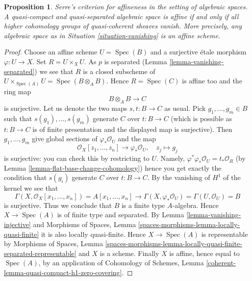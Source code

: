 \documentclass{stacks-project}
\newenvironment{slogan}{\comment}{\endcomment}
\theoremstyle{plain}
\newtheorem{proposition}[subsection]{Proposition}
\theoremstyle{definition}
\theoremstyle{remark}
\numberwithin{equation}{subsection}
\def\Spec{\mathop{\mathrm{Spec}}}
\begin{document}
\begin{proposition}
\label{proposition-vanishing-affine}
\begin{slogan}
Serre's criterion for affineness in the setting of algebraic spaces.
\end{slogan}
A quasi-compact and quasi-separated algebraic space is affine
if and only if all higher cohomology groups of quasi-coherent sheaves
vanish. More precisely, any algebraic space as in
Situation \ref{situation-vanishing} is an affine scheme.
\end{proposition}

\begin{proof}
Choose an affine scheme $U = \Spec(B)$ and a surjective \'etale
morphism $\varphi : U \to X$. Set $R = U \times_X U$. As $p$ is separated
(Lemma \ref{lemma-vanishing-separated}) we see that $R$ is a
closed subscheme of $U \times_{\Spec(A)} U = \Spec(B \otimes_A B)$.
Hence $R = \Spec(C)$ is affine too and the ring map
$$
B \otimes_A B \longrightarrow C
$$
is surjective. Let us denote the two maps $s, t : B \to C$ as usual. Pick
$g_1, \ldots, g_m \in B$ such that $s(g_1), \ldots, s(g_m)$ generate $C$
over $t : B \to C$ (which is possible as $t : B \to C$ is of finite
presentation and the displayed map is surjective). Then $g_1, \ldots, g_m$
give global sections of $\varphi_*\mathcal{O}_U$ and the map
$$
\mathcal{O}_X[z_1, \ldots, z_n] \longrightarrow \varphi_*\mathcal{O}_U,
\quad
z_j \longmapsto g_j
$$
is surjective: you can check this by restricting to $U$.
Namely, $\varphi^*\varphi_*\mathcal{O}_U = t_*\mathcal{O}_R$
(by Lemma \ref{lemma-flat-base-change-cohomology})
hence you get exactly the condition that $s(g_i)$ generate $C$
over $t : B \to C$. By the vanishing of $H^1$ of the kernel we see that
$$
\Gamma(X, \mathcal{O}_X[x_1, \ldots, x_n]) =
A[x_1, \ldots, x_n] \longrightarrow
\Gamma(X, \varphi_*\mathcal{O}_U) = \Gamma(U, \mathcal{O}_U) = B
$$
is surjective. Thus we conclude that $B$ is a finite type $A$-algebra.
Hence $X \to \Spec(A)$ is of finite type and separated.
By Lemma \ref{lemma-vanishing-injective}
and
Morphisms of Spaces, Lemma \ref{spaces-morphisms-lemma-locally-quasi-finite}
it is also locally quasi-finite. Hence $X \to \Spec(A)$ is representable by
Morphisms of Spaces, Lemma
\ref{spaces-morphisms-lemma-locally-quasi-finite-separated-representable}
and $X$ is a scheme. Finally $X$ is affine, hence equal to $\Spec(A)$,
by an application of Cohomology of Schemes, Lemma
\ref{coherent-lemma-quasi-compact-h1-zero-covering}.
\end{proof}
\end{document}
